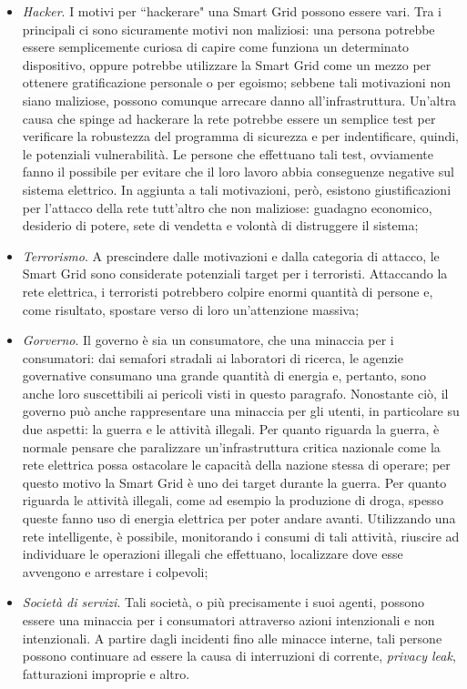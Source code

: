\begin{itemize}
\begin{itemize}
	\item \textit{Hacker}. I motivi per ``hackerare" una Smart Grid possono essere vari. Tra i principali ci sono sicuramente motivi non maliziosi: una persona potrebbe essere semplicemente curiosa di capire come funziona un determinato dispositivo, oppure potrebbe utilizzare la Smart Grid come un mezzo per ottenere gratificazione personale o per egoismo; sebbene tali motivazioni non siano maliziose, possono comunque arrecare danno all'infrastruttura. Un'altra causa che spinge ad hackerare la rete potrebbe essere un semplice test per verificare la robustezza del programma di sicurezza e per indentificare, quindi, le potenziali vulnerabilità. Le persone che effettuano tali test, ovviamente fanno il possibile per evitare che il loro lavoro abbia conseguenze negative sul sistema elettrico. In aggiunta a tali motivazioni, però, esistono giustificazioni per l'attacco della rete tutt'altro che non maliziose: guadagno economico, desiderio di potere, sete di vendetta e volontà di distruggere il sistema;
	\item \textit{Terrorismo}. A prescindere dalle motivazioni e dalla categoria di attacco, le Smart Grid sono considerate potenziali target per i terroristi. Attaccando la  rete elettrica, i terroristi potrebbero colpire enormi quantità di persone e, come risultato, spostare verso di loro un'attenzione massiva;
	\item \textit{Gorverno}. Il governo è sia un consumatore, che una minaccia per i consumatori: dai semafori stradali ai laboratori di ricerca, le agenzie governative consumano una grande quantità di energia e, pertanto, sono anche loro suscettibili ai pericoli visti in questo paragrafo. Nonostante ciò, il governo può anche rappresentare una minaccia per gli utenti, in particolare su due aspetti: la guerra e le attività illegali. Per quanto riguarda la guerra, è normale pensare che paralizzare un'infrastruttura critica nazionale come la rete elettrica possa ostacolare le capacità della nazione stessa di operare; per questo motivo la Smart Grid è uno dei target durante la guerra. Per quanto riguarda le attività illegali, come ad esempio la produzione di droga, spesso queste fanno uso di energia elettrica per poter andare avanti. Utilizzando una rete intelligente, è possibile, monitorando i consumi di tali attività, riuscire ad individuare le operazioni illegali che effettuano, localizzare dove esse avvengono e arrestare i colpevoli;
	\item \textit{Società di servizi}. Tali società, o più precisamente i suoi agenti, possono essere una minaccia per i consumatori attraverso azioni intenzionali e non intenzionali. A partire dagli incidenti fino alle minacce interne, tali persone possono continuare ad essere la causa di interruzioni di corrente,  \textit{privacy leak}, fatturazioni improprie e altro.
	\end{itemize}
\end{itemize}

